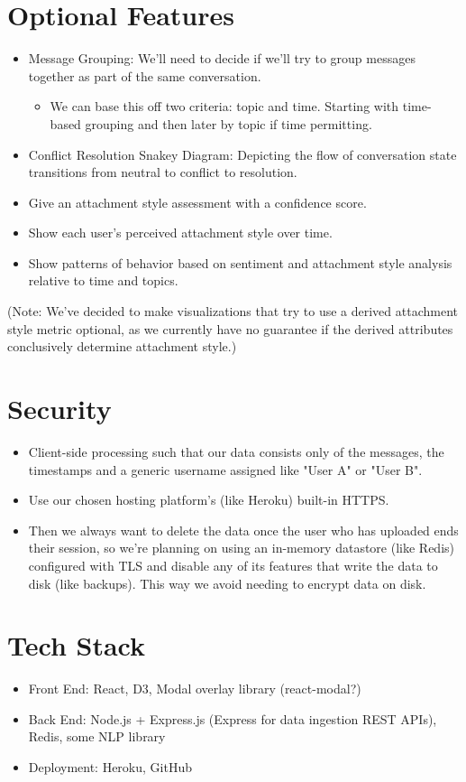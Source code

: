 \documentclass{article}\usepackage{graphicx}
\begin{document}
\section*{Optional Features}
\begin{itemize}
    \item Message Grouping: We’ll need to decide if we’ll try to group messages together as part of the same conversation.
        \begin{itemize}
            \item We can base this off two criteria: topic and time. Starting with time-based grouping and then later by topic if time permitting.
        \end{itemize}
    \item Conflict Resolution Snakey Diagram: Depicting the flow of conversation state transitions from neutral to conflict to resolution.
    \item Give an attachment style assessment with a confidence score.
    \item Show each user's perceived attachment style over time.
    \item Show patterns of behavior based on sentiment and attachment style analysis relative to time and topics.
\end{itemize}
(Note: We’ve decided to make visualizations that try to use a derived attachment style metric optional, as we currently have no guarantee if the derived attributes conclusively determine attachment style.)

\section*{Security}
\begin{itemize}
    \item Client-side processing such that our data consists only of the messages, the timestamps and a generic username assigned like "User A" or "User B".
    \item Use our chosen hosting platform's (like Heroku) built-in HTTPS.
    \item Then we always want to delete the data once the user who has uploaded ends their session, so we're planning on using an in-memory datastore (like Redis) configured with TLS and disable any of its features that write the data to disk (like backups). This way we avoid needing to encrypt data on disk.
\end{itemize}

\section*{Tech Stack}
\begin{itemize}
    \item Front End: React, D3, Modal overlay library (react-modal?)
    \item Back End: Node.js + Express.js (Express for data ingestion REST APIs), Redis, some NLP library
    \item Deployment: Heroku, GitHub
\end{itemize}
\end{document}
